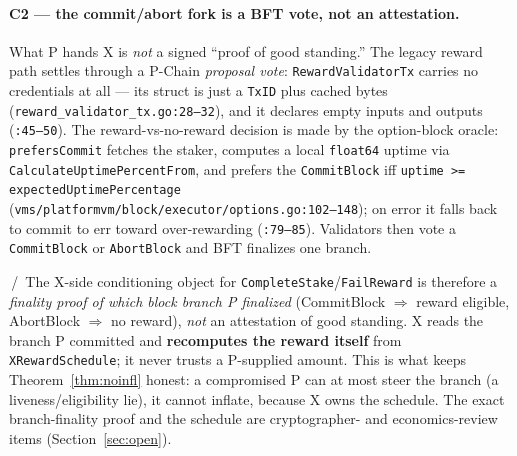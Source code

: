\paragraph{C2 --- the commit/abort fork is a BFT vote, not an
attestation.} What P hands X is \emph{not} a signed ``proof of good
standing.'' The legacy reward path settles through a P-Chain
\emph{proposal vote}: \texttt{RewardValidatorTx} carries no credentials
at all --- its struct is just a \texttt{TxID} plus cached bytes
(\texttt{reward\_validator\_tx.go:28--32}), and it declares empty inputs
and outputs (\texttt{:45--50}). The reward-vs-no-reward decision is made
by the option-block oracle: \texttt{prefersCommit} fetches the staker,
computes a local \texttt{float64} uptime via
\texttt{CalculateUptimePercentFrom}, and prefers the \texttt{CommitBlock}
iff \texttt{uptime >= expectedUptimePercentage}
(\texttt{vms/platformvm/block/executor/options.go:102--148}); on error it
falls back to commit to err toward over-rewarding (\texttt{:79--85}).
Validators then vote a \texttt{CommitBlock} or \texttt{AbortBlock} and
BFT finalizes one branch.

\CRYPTO{}\,/\,\DESIGN{} The X-side conditioning object for
\texttt{CompleteStake}/\texttt{FailReward} is therefore a \emph{finality
proof of which block branch P finalized} (CommitBlock $\Rightarrow$
reward eligible, AbortBlock $\Rightarrow$ no reward), \emph{not} an
attestation of good standing. X reads the branch P committed and
\textbf{recomputes the reward itself} from \texttt{XRewardSchedule}; it
never trusts a P-supplied amount. This is what keeps
Theorem~\ref{thm:noinfl} honest: a compromised P can at most steer the
branch (a liveness/eligibility lie), it cannot inflate, because X owns
the schedule. The exact branch-finality proof and the schedule are
cryptographer- and economics-review items
(Section~\ref{sec:open}).

